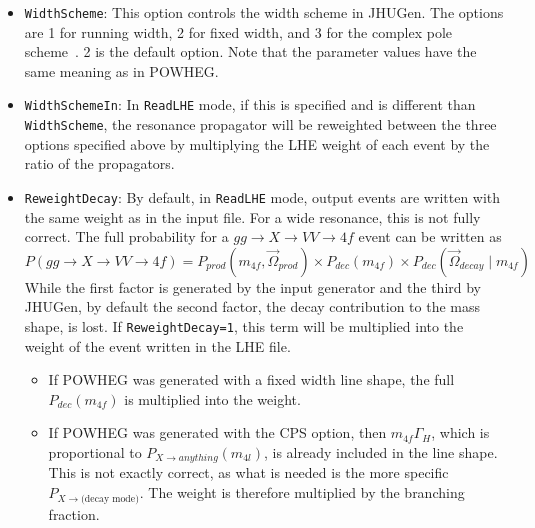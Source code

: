 \documentclass[aps,superscriptaddress,nofootinbib]{revtex4}
\newcommand{\eg}{e.g.~}
\begin{document}
\begin{itemize}
\begin{itemize}
     \item $\pm8$: If the scheme number is positive, $\mu_{F,\,R} \propto \sqrt{q^2_{J}}+\sqrt{q^2_{H}}$, where $J$ is the more massive associated particle. If the scheme number is negative and the matrix element treats an associated particle as massive (\eg $t$ in $t+H$), $\mu_{F,\,R} \propto m_{J}+m_{H}$ for the most massive associated particle (same as option -7).  $-8$ is the default value for \verb|Process| 110, 111, 112 and 113. with scale multiplier $0.25$.
     \item $\pm9$: If the scheme number is positive, $\mu_{F,\,R} \propto \sqrt{q^2_{J}}$, where $J$ is the more massive associated particle. If the scheme number is negative and the matrix element treats an associated particle as massive (\eg $t$ in $t+H$), $\mu_{F,\,R} \propto m_{J}$.
     \end{itemize}
\item \verb|WidthScheme|: This option controls the width scheme in JHUGen. The options are 1 for running width, 2 for fixed width, and 3 for the complex pole scheme~\cite{Passarino:2010qk,Goria:2011wa}. 2 is the default option.  Note that the parameter values have the same meaning as in POWHEG.
\item \verb|WidthSchemeIn|: In \verb|ReadLHE| mode, if this is specified and is different than \verb|WidthScheme|, the resonance propagator will be reweighted between the three options specified above by multiplying the LHE weight of each event by the ratio of the propagators.
\item \verb|ReweightDecay|: By default, in \verb|ReadLHE| mode, output events are written with the same weight as in the input file.  For a wide resonance, this is not fully correct.  The full probability for a $gg\to X\to VV\to 4f$ event can be written as
\[
P(gg\to X\to VV\to 4f)=P_{prod}(m_{4f},\vec{\Omega}_{prod})\times P_{dec}(m_{4f})\times P_{dec}(\vec{\Omega}_{decay}\mid m_{4f})
\]
While the first factor is generated by the input generator and the third by JHUGen, by default the second factor, the decay contribution to the mass shape, is lost.  If \verb|ReweightDecay=1|, this term will be multiplied into the weight of the event written in the LHE file.
\begin{itemize}
\item If POWHEG was generated with a fixed width line shape, the full $P_{dec}(m_{4f})$ is multiplied into the weight.
\item If POWHEG was generated with the CPS option, then $m_{4f}\Gamma_H$, which is proportional to $P_{X\to anything}(m_{4l})$, is already included in the line shape.  This is not exactly correct, as what is needed is the more specific $P_{X\to\text{(decay mode)}}$.  The weight is therefore multiplied by the branching fraction.

\end{itemize}
\end{itemize}
\end{document}
